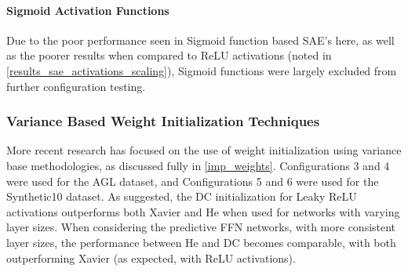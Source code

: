 \documentclass[a4paper,latin]{paper}
\begin{document}
\paragraph{Sigmoid Activation Functions} 
Due to the poor performance seen in Sigmoid function based SAE's here, as well as the poorer results when compared to ReLU activations (noted in \ref{results_sae_activations_scaling}), Sigmoid functions were largely excluded from further configuration testing.


\subsubsection{Variance Based Weight Initialization Techniques}

More recent research has focused on the use of weight initialization using variance base methodologies, as discussed fully in \ref{imp_weights}. Configurations 3 and 4 were used for the AGL dataset, and Configurations 5 and 6 were used for the Synthetic10 dataset. As suggested, the DC initialization for Leaky ReLU activations outperforms both Xavier and He when used for networks with varying layer sizes. When considering the predictive FFN networks, with more consistent layer sizes, the performance between He and DC becomes comparable, with both outperforming Xavier (as expected, with ReLU activations).
\end{document}
